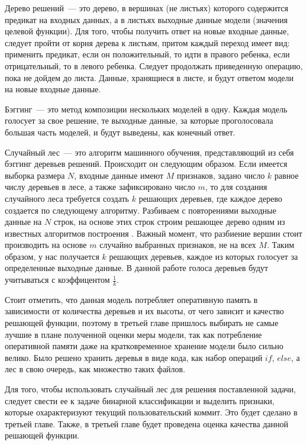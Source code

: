 Дерево решений~--- это дерево, в вершинах (не листьях) которого содержится предикат на входных данных, а в листьях выходные данные модели (значения целевой функции). Для того, чтобы получить ответ на новые входные данные, следует пройти от корня дерева к листьям, притом каждый переход имеет вид: применить предикат, если он положительный, то идти в правого ребенка, если отрицательный, то в левого ребенка. Следует продолжать приведенную операцию, пока не дойдем до листа. Данные, хранящиеся в листе, и будут ответом модели на новые входные данные.

Бэггинг~--- это метод композиции нескольких моделей в одну. Каждая модель голосует за свое решение, те выходные данные, за которые проголосовала большая часть моделей, и будут выведены, как конечный ответ.

Случайный лес~--- это алгоритм машинного обучения, представляющий из себя бэггинг деревьев решений. Происходит он следующим образом. Если имеется выборка размера $N$, входные данные имеют $M$ признаков, задано число $k$ равное числу деревьев в лесе, а также зафиксировано число $m$, то для создания случайного леса требуется создать $k$ решающих деревьев, где каждое дерево создается по следующему алгоритму. Разбиваем с повторениями выходные данные на $N$ строк, на основе этих строк строим решающее дерево одним из известных алгоритмов построения \cite{decision-tree}. Важный момент, что разбиение вершин стоит производить на основе $m$ случайно выбранных признаков, не на всех $M$. Таким образом, у нас получается $k$ решающих деревьев, каждое из которых голосует за определенные выходные данные. В данной работе голоса деревьев будут учитываться с коэффицентом $\frac{1}{k}$.

Стоит отметить, что данная модель потребляет оперативную память в зависимости от количества деревьев и их высоты, от чего зависит и качество решающей функции, поэтому в третьей главе пришлось выбирать не самые лучшие в плане полученной оценки меры модели, так как потребление оперативной памяти даже на кратковременное хранение модели было сильно велико. Было решено хранить деревья в виде кода, как набор операций $if$, $else$, а лес в свою очередь, как множество таких файлов.

Для того, чтобы использовать случайный лес для решения поставленной задачи, следует свести ее к задаче бинарной классификации и выделить признаки, которые охарактеризуют текущий пользовательский коммит. Это будет сделано в третьей главе. Также, в третьей главе будет проведена оценка качества данной решающей функции.

